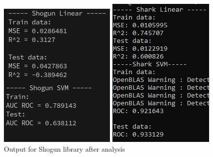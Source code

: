 \begin{figure}[!ht]
	\centering
	\begin{minipage}{0.31\textwidth}
		\centering
		\includegraphics[width=0.8\linewidth]{Rozdzial7/shogun_linear_svm}
		\caption{Output for Shogun library after analysis}
		\label{fig:shogun_linear_svm2}		
	\end{minipage}%
	\hspace{0.02\textwidth}
	\begin{minipage}{0.31\textwidth}
		\centering
		\includegraphics[width=0.7\linewidth]{Rozdzial7/shark_linear_svm}

\end{minipage}
\end{figure}

